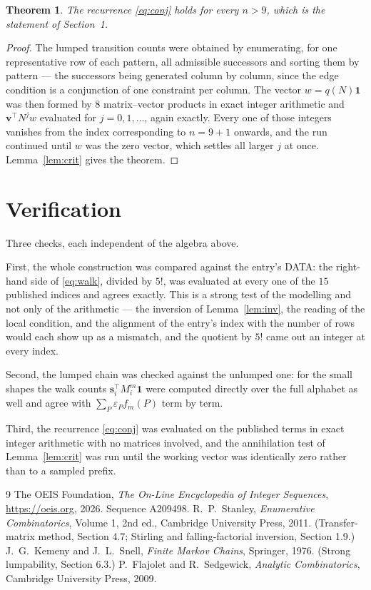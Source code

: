 \documentclass[11pt,a4paper]{article}
\theoremstyle{plain}
\newtheorem{theorem}{Theorem}
\theoremstyle{definition}
\begin{document}
\begin{theorem}
The recurrence \eqref{eq:conj} holds for every $n>9$, which is the statement of
Section~1.
\end{theorem}

\begin{proof}
The lumped transition counts were obtained by enumerating, for one representative row of
each pattern, all admissible successors and sorting them by pattern --- the successors being
generated column by column, since the edge condition is a conjunction of one constraint per
column. The vector $w=q(N)\mathbf{1}$ was then formed by $8$ matrix--vector products
in exact integer arithmetic and $\mathbf{v}^{\!\top}N^{j}w$ evaluated for
$j=0,1,\dots$, again exactly. Every one of those integers vanishes from the index
corresponding to $n=9+1$ onwards, and the run continued until $w$ was the zero vector,
which settles all larger $j$ at once. Lemma~\ref{lem:crit} gives the theorem.
\end{proof}

\section{Verification}

Three checks, each independent of the algebra above.

First, the whole construction was compared against the entry's DATA: the right-hand side of
\eqref{eq:walk}, divided by $5!$, was evaluated at every one of the $15$
published indices and agrees exactly. This is a strong test of the modelling and not only of
the arithmetic --- the inversion of Lemma~\ref{lem:inv}, the reading of the local
condition, and the alignment of the entry's index with the number of rows would each
show up as a mismatch, and the quotient by $5!$ came out an integer at every index.

Second, the lumped chain was checked against the unlumped one: for the small shapes the walk
counts $\mathbf{s}_i^{\!\top}M_i^{m}\mathbf{1}$ were computed directly over the full
alphabet as well and agree with $\sum_P\varepsilon_Pf_m(P)$ term by term.

Third, the recurrence \eqref{eq:conj} was evaluated on the published terms in exact integer
arithmetic with no matrices involved, and the annihilation test of Lemma~\ref{lem:crit} was
run until the working vector was identically zero rather than to a sampled prefix.

\begin{thebibliography}{9}
 The OEIS Foundation, \emph{The On-Line Encyclopedia of Integer
Sequences}, \url{https://oeis.org}, 2026. Sequence A209498.
 R.~P.~Stanley, \emph{Enumerative Combinatorics}, Volume 1, 2nd ed.,
Cambridge University Press, 2011. (Transfer-matrix method, Section 4.7; Stirling and
falling-factorial inversion, Section 1.9.)
 J.~G.~Kemeny and J.~L.~Snell, \emph{Finite Markov Chains}, Springer,
1976. (Strong lumpability, Section 6.3.)
 P.~Flajolet and R.~Sedgewick, \emph{Analytic Combinatorics}, Cambridge
University Press, 2009.
\end{thebibliography}
\end{document}
